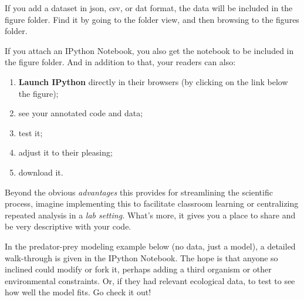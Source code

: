 If you add a dataset in json, csv, or dat format, the data will be included in the figure folder. Find it by going to the folder view, and then browsing to the figures folder.

If you attach an IPython Notebook, you also get the notebook to be included in the figure folder. And in addition to that, your readers can also: 
\begin{enumerate}
\item \textbf{Launch IPython} directly in their browsers (by clicking on the link below the figure);
\item see your annotated code and data;
\item test it;
\item adjust it to their pleasing;
\item download it.
\end{enumerate}
Beyond the obvious \textit{advantages }this provides for streamlining the scientific process, imagine implementing this to facilitate classroom learning or centralizing repeated analysis in a \textit{lab setting.}  What's more, it gives you a place to share and be very descriptive with your code.  

In the predator-prey modeling example below (no data, just a model), a detailed walk-through is given in the IPython Notebook. The hope is that anyone so inclined could modify or fork it, perhaps adding a third organism or other environmental constraints.  Or, if they had relevant ecological data, to test to see how well the model fits. Go check it out!
